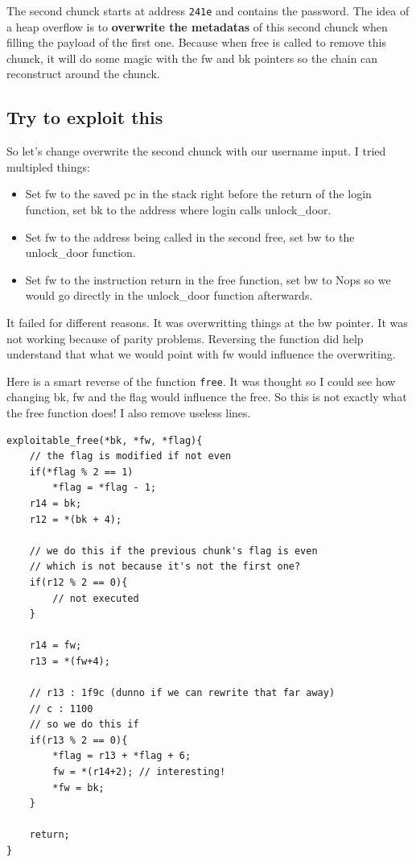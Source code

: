 The second chunck starts at address \texttt{241e} and contains the
password. The idea of a heap overflow is to \textbf{overwrite the
metadatas} of this second chunck when filling the payload of the first
one. Because when free is called to remove this chunck, it will do some
magic with the fw and bk pointers so the chain can reconstruct around
the chunck.

\subsection{Try to exploit this}\label{try-to-exploit-this}

So let's change overwrite the second chunck with our username input. I
tried multipled things:

\begin{itemize}
\itemsep1pt\parskip0pt
\item
  Set fw to the saved pc in the stack right before the return of the
  login function, set bk to the address where login calls unlock\_door.
\item
  Set fw to the address being called in the second free, set bw to the
  unlock\_door function.
\item
  Set fw to the instruction return in the free function, set bw to Nops
  so we would go directly in the unlock\_door function afterwards.
\end{itemize}

It failed for different reasons. It was overwritting things at the bw
pointer. It was not working because of parity problems. Reversing the
function did help understand that what we would point with fw would
influence the overwriting.

Here is a smart reverse of the function \texttt{free}. It was thought so
I could see how changing bk, fw and the flag would influence the free.
So this is not exactly what the free function does! I also remove
useless lines.

\begin{verbatim}
exploitable_free(*bk, *fw, *flag){
    // the flag is modified if not even
    if(*flag % 2 == 1)
        *flag = *flag - 1;
    r14 = bk;
    r12 = *(bk + 4);

    // we do this if the previous chunk's flag is even
    // which is not because it's not the first one?
    if(r12 % 2 == 0){
        // not executed
    }

    r14 = fw;
    r13 = *(fw+4);

    // r13 : 1f9c (dunno if we can rewrite that far away)
    // c : 1100
    // so we do this if
    if(r13 % 2 == 0){
        *flag = r13 + *flag + 6;
        fw = *(r14+2); // interesting!
        *fw = bk;
    }

    return;
}
\end{verbatim}

